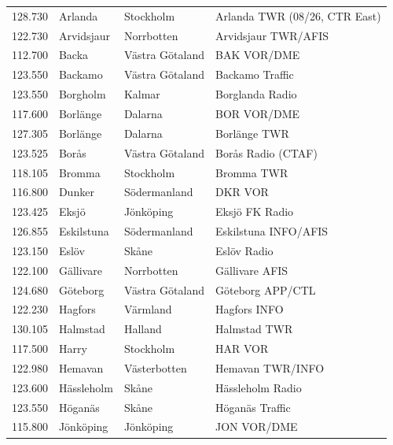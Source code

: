 \begin{longtable}{rlll}
  128.730 & Arlanda      & Stockholm       & Arlanda TWR (08/26, CTR East)   \\
  122.730 & Arvidsjaur   & Norrbotten      & Arvidsjaur TWR/AFIS             \\
  112.700 & Backa        & Västra Götaland & BAK VOR/DME                     \\
  123.550 & Backamo      & Västra Götaland & Backamo Traffic                 \\
  123.550 & Borgholm     & Kalmar          & Borglanda Radio                 \\
  117.600 & Borlänge     & Dalarna         & BOR VOR/DME                     \\
  127.305 & Borlänge     & Dalarna         & Borlänge TWR                    \\
  123.525 & Borås        & Västra Götaland & Borås Radio (CTAF)              \\
  118.105 & Bromma       & Stockholm       & Bromma TWR                      \\
  116.800 & Dunker       & Södermanland    & DKR VOR                         \\
  123.425 & Eksjö        & Jönköping       & Eksjö FK Radio                  \\
  126.855 & Eskilstuna   & Södermanland    & Eskilstuna INFO/AFIS            \\
  123.150 & Eslöv        & Skåne           & Eslöv Radio                     \\
  122.100 & Gällivare    & Norrbotten      & Gällivare AFIS                  \\
  124.680 & Göteborg     & Västra Götaland & Göteborg APP/CTL                \\
  122.230 & Hagfors      & Värmland        & Hagfors INFO                    \\
  130.105 & Halmstad     & Halland         & Halmstad TWR                    \\
  117.500 & Harry        & Stockholm       & HAR VOR                         \\
  122.980 & Hemavan      & Västerbotten    & Hemavan TWR/INFO                \\
  123.600 & Hässleholm   & Skåne           & Hässleholm Radio                \\
  123.550 & Höganäs      & Skåne           & Höganäs Traffic                 \\
  115.800 & Jönköping    & Jönköping       & JON VOR/DME                     \\

\end{longtable}
